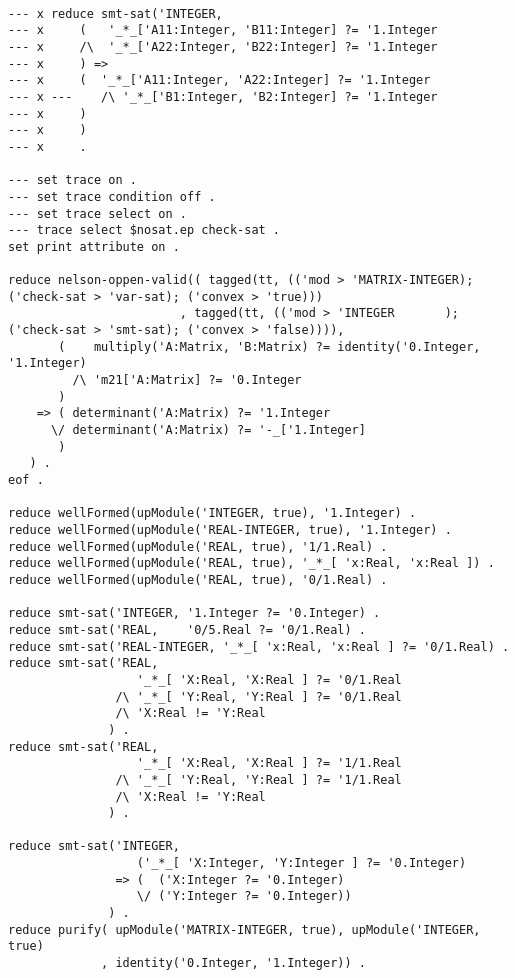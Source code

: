 \documentclass[]{article}
\begin{document}
\begin{verbatim}

--- x reduce smt-sat('INTEGER,
--- x     (   '_*_['A11:Integer, 'B11:Integer] ?= '1.Integer
--- x     /\  '_*_['A22:Integer, 'B22:Integer] ?= '1.Integer
--- x     ) =>
--- x     (  '_*_['A11:Integer, 'A22:Integer] ?= '1.Integer
--- x ---    /\ '_*_['B1:Integer, 'B2:Integer] ?= '1.Integer 
--- x     )
--- x     )
--- x     .

--- set trace on .
--- set trace condition off .
--- set trace select on .
--- trace select $nosat.ep check-sat .
set print attribute on .

reduce nelson-oppen-valid(( tagged(tt, (('mod > 'MATRIX-INTEGER);  ('check-sat > 'var-sat); ('convex > 'true)))
                        , tagged(tt, (('mod > 'INTEGER       );  ('check-sat > 'smt-sat); ('convex > 'false)))),
       (    multiply('A:Matrix, 'B:Matrix) ?= identity('0.Integer, '1.Integer)
         /\ 'm21['A:Matrix] ?= '0.Integer
       )
    => ( determinant('A:Matrix) ?= '1.Integer
      \/ determinant('A:Matrix) ?= '-_['1.Integer]
       )
   ) .
eof .

reduce wellFormed(upModule('INTEGER, true), '1.Integer) .
reduce wellFormed(upModule('REAL-INTEGER, true), '1.Integer) .
reduce wellFormed(upModule('REAL, true), '1/1.Real) .
reduce wellFormed(upModule('REAL, true), '_*_[ 'x:Real, 'x:Real ]) .
reduce wellFormed(upModule('REAL, true), '0/1.Real) .

reduce smt-sat('INTEGER, '1.Integer ?= '0.Integer) .
reduce smt-sat('REAL,    '0/5.Real ?= '0/1.Real) .
reduce smt-sat('REAL-INTEGER, '_*_[ 'x:Real, 'x:Real ] ?= '0/1.Real) .
reduce smt-sat('REAL,
                  '_*_[ 'X:Real, 'X:Real ] ?= '0/1.Real
               /\ '_*_[ 'Y:Real, 'Y:Real ] ?= '0/1.Real
               /\ 'X:Real != 'Y:Real
              ) .
reduce smt-sat('REAL,
                  '_*_[ 'X:Real, 'X:Real ] ?= '1/1.Real
               /\ '_*_[ 'Y:Real, 'Y:Real ] ?= '1/1.Real
               /\ 'X:Real != 'Y:Real
              ) .

reduce smt-sat('INTEGER,
                  ('_*_[ 'X:Integer, 'Y:Integer ] ?= '0.Integer)
               => (  ('X:Integer ?= '0.Integer)
                  \/ ('Y:Integer ?= '0.Integer))
              ) .
reduce purify( upModule('MATRIX-INTEGER, true), upModule('INTEGER, true)
             , identity('0.Integer, '1.Integer)) .
\end{verbatim}
\end{document}
